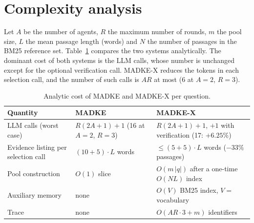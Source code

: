 \section{Complexity analysis}
\label{sec:complexity}

Let $A$ be the number of agents, $R$ the maximum number of rounds, $m$ the pool size, $L$ the mean passage length (words) and $N$ the number of passages in the BM25 reference set. Table~\ref{tab:complexity} compares the two systems analytically. The dominant cost of both systems is the LLM calls, whose number is unchanged except for the optional verification call. MADKE-X reduces the tokens in each selection call, and the number of such calls is $AR$ at most (6 at $A{=}2$, $R{=}3$).

\begin{table}[!htbp]
\centering
\small
\caption{Analytic cost of MADKE and MADKE-X per question.}
\label{tab:complexity}
\begin{tabular}{p{}p{}p{}}
\toprule
Quantity & MADKE & MADKE-X \\
\midrule
LLM calls (worst case) & $R(2A{+}1){+}1$ (16 at $A{=}2$, $R{=}3$) & $R(2A{+}1){+}1$, $+1$ with verification (17: $+6.25\%$) \\
Evidence listing per selection call & $(10{+}5)\cdot L$ words & $\le (5{+}5)\cdot L$ words ($-33\%$ passages) \\
Pool construction & $O(1)$ slice & $O(m\,|q|)$ after a one-time $O(NL)$ index \\
Auxiliary memory & none & $O(V)$ BM25 index, $V=$ vocabulary \\
Trace & none & $O(AR\cdot 3 + m)$ identifiers \\
\bottomrule
\end{tabular}
\end{table}

